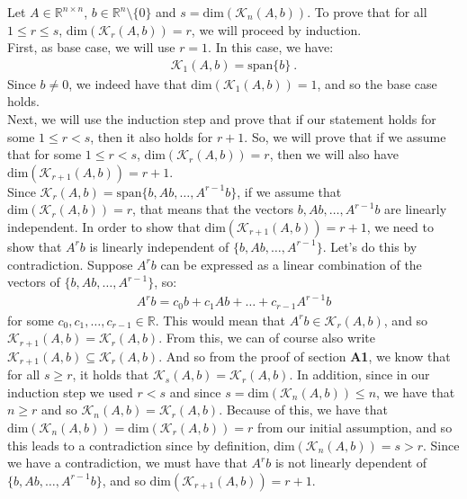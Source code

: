 \documentclass[a4paper,10pt]{article}
\begin{document}
Let $A \in \mathbb{R}^{n \times n}$, $b \in \mathbb{R}^n \setminus \{0\}$ and $s = \text{dim}(\mathcal{K}_n(A,b))$. To prove that for all $1 \leq r \leq s$, $\text{dim}(\mathcal{K}_r(A,b)) = r$, we will proceed by induction. \\

First, as base case, we will use $r=1$. In this case, we have:
\begin{align*}
    \mathcal{K}_1(A,b) = \text{span}\{b\} \ .
\end{align*}
Since $b \neq 0$, we indeed have that $\text{dim}(\mathcal{K}_1(A,b)) = 1$, and so the base case holds. \\

Next, we will use the induction step and prove that if our statement holds for some $1 \leq r < s$, then it also holds for $r+1$. So, we will prove that if we assume that for some $1 \leq r < s$, $\text{dim}(\mathcal{K}_r(A,b)) = r$, then we will also have $\text{dim}(\mathcal{K}_{r+1}(A,b)) = r+1$. \\

Since $\mathcal{K}_r(A,b) = \text{span}\{b,Ab,\dots,A^{r-1}b\}$, if we assume that $\text{dim}(\mathcal{K}_r(A,b)) = r$, that means that the vectors $b,Ab,\dots,A^{r-1}b$ are linearly independent. In order to show that $\text{dim}(\mathcal{K}_{r+1}(A,b)) = r+1$, we need to show that $A^rb$ is linearly independent of $\{b,Ab,\dots,A^{r-1}\}$. Let's do this by contradiction. Suppose $A^rb$ can be expressed as a linear combination of the vectors of $\{b,Ab,\dots,A^{r-1}\}$, so:
\begin{align*}
    A^rb = c_0 b + c_1 Ab + \dots + c_{r-1}A^{r-1}b
\end{align*}
for some $c_0,c_1,\dots,c_{r-1} \in \mathbb{R}$. This would mean that $A^rb \in \mathcal{K}_r(A,b)$, and so $\mathcal{K}_{r+1}(A,b) = \mathcal{K}_r(A,b)$. From this, we can of course also write $\mathcal{K}_{r+1}(A,b) \subseteq \mathcal{K}_r(A,b)$. And so from the proof of section \textbf{A1}, we know that for all $s \geq r$, it holds that $\mathcal{K}_s(A,b) = \mathcal{K}_r(A,b)$. In addition, since in our induction step we used $r < s$ and since $s = \text{dim}(\mathcal{K}_n(A,b)) \leq n$, we have that $n \geq r$ and so $\mathcal{K}_n(A,b) = \mathcal{K}_r(A,b)$. Because of this, we have that $\text{dim}(\mathcal{K}_n(A,b)) = \text{dim}(\mathcal{K}_r(A,b)) = r$ from our initial assumption, and so this leads to a contradiction since by definition, $\text{dim}(\mathcal{K}_n(A,b)) = s > r$. Since we have a contradiction, we must have that $A^rb$ is not linearly dependent of $\{b,Ab,\dots,A^{r-1}b\}$, and so $\text{dim}(\mathcal{K}_{r+1}(A,b)) = r+1$. \\
\end{document}
